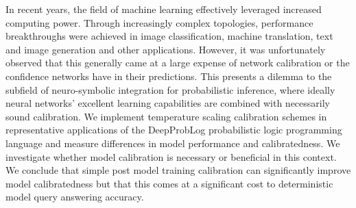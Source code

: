 In recent years, the field of machine learning effectively leveraged increased computing power. Through increasingly complex topologies, performance breakthroughs were achieved in image classification, machine translation, text and image generation and other applications. However, it was unfortunately observed that this generally came at a large expense of network calibration or the confidence networks have in their predictions. This presents a dilemma to the subfield of neuro-symbolic integration for probabilistic inference, where ideally neural networks' excellent learning capabilities are combined with necessarily sound calibration. We implement temperature scaling calibration schemes in representative applications of the DeepProbLog probabilistic logic programming language and measure differences in model performance and calibratedness. We investigate whether model calibration is necessary or beneficial in this context. We conclude that simple post model training calibration can significantly improve model calibratedness but that this comes at a significant cost to deterministic model query answering accuracy.